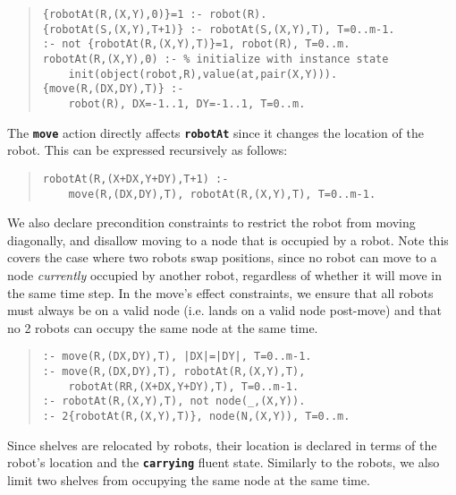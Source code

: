 \documentclass[letterpaper]{article}
\newcommand{\ct}[1]{\texttt{\textbf{#1}}}
\begin{document}
\begin{quote}\begin{scriptsize}\begin{verbatim}
{robotAt(R,(X,Y),0)}=1 :- robot(R).
{robotAt(S,(X,Y),T+1)} :- robotAt(S,(X,Y),T), T=0..m-1.
:- not {robotAt(R,(X,Y),T)}=1, robot(R), T=0..m.
robotAt(R,(X,Y),0) :- % initialize with instance state
    init(object(robot,R),value(at,pair(X,Y))).
{move(R,(DX,DY),T)} :-
    robot(R), DX=-1..1, DY=-1..1, T=0..m.
\end{verbatim}\end{scriptsize}\end{quote}

The  \ct{move}  action directly affects \ct{robotAt} since it changes the location of the robot. This can be expressed recursively as follows:
\begin{quote}\begin{scriptsize}\begin{verbatim}
robotAt(R,(X+DX,Y+DY),T+1) :-
    move(R,(DX,DY),T), robotAt(R,(X,Y),T), T=0..m-1.
\end{verbatim}\end{scriptsize}\end{quote}

We also declare precondition constraints to restrict the robot from moving diagonally, and disallow moving to a node that is occupied by a robot. Note this covers the case where two robots swap positions, since no robot can move to a node \emph{currently} occupied by another robot, regardless of whether it will move in the same time step.
In the move's effect constraints, we ensure that all robots must always be on a valid node (i.e. lands on a valid node post-move) and that no 2 robots can occupy the same node at the same time.

\begin{quote}\begin{scriptsize}\begin{verbatim}
:- move(R,(DX,DY),T), |DX|=|DY|, T=0..m-1.
:- move(R,(DX,DY),T), robotAt(R,(X,Y),T),
    robotAt(RR,(X+DX,Y+DY),T), T=0..m-1.
:- robotAt(R,(X,Y),T), not node(_,(X,Y)).
:- 2{robotAt(R,(X,Y),T)}, node(N,(X,Y)), T=0..m.
\end{verbatim}\end{scriptsize}\end{quote}

Since shelves are relocated by robots, their location is declared in terms of the robot's location and the \ct{carrying}  fluent state. Similarly to the robots, we also limit two shelves from occupying the same node at the same time.
\end{document}
